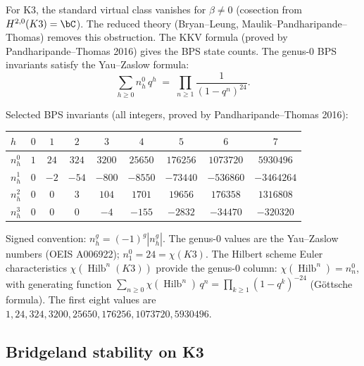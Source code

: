 \begin{remark}
\label{rem:gw-k3}
For K3, the standard virtual class vanishes for $\beta \neq 0$
(cosection from $H^{2,0}(K3) = \bC$). The reduced theory
(Bryan--Leung, Maulik--Pandharipande--Thomas) removes this
obstruction. The KKV formula (proved by Pandharipande--Thomas
2016) gives the BPS state counts. The genus-$0$ BPS invariants
satisfy the Yau--Zaslow formula:
\begin{equation}\label{eq:yau-zaslow}
\sum_{h \geq 0} n^0_h\,q^h \;=\; \prod_{n \geq 1}
\frac{1}{(1 - q^n)^{24}}.
\end{equation}
\end{remark}

\begin{proposition}
\label{prop:bps-k3}
Selected BPS invariants \textup{(}all integers, proved by
Pandharipande--Thomas 2016\textup{)}:
\begin{center}
\small
\renewcommand{\arraystretch}{1.2}
\begin{tabular}{lcccccccc}
$h$ & $0$ & $1$ & $2$ & $3$ & $4$ & $5$ & $6$ & $7$ \\
\hline
$n^0_h$ & $1$ & $24$ & $324$ & $3200$ & $25650$ & $176256$
 & $1073720$ & $5930496$ \\
$n^1_h$ & $0$ & $-2$ & $-54$ & $-800$ & $-8550$ & $-73440$
 & $-536860$ & $-3464264$ \\
$n^2_h$ & $0$ & $0$ & $3$ & $104$ & $1701$ & $19656$
 & $176358$ & $1316808$ \\
$n^3_h$ & $0$ & $0$ & $0$ & $-4$ & $-155$ & $-2832$
 & $-34470$ & $-320320$
\end{tabular}
\end{center}
Signed convention: $n^g_h = (-1)^g |n^g_h|$. The genus-$0$
values are the Yau--Zaslow numbers \textup{(}OEIS A006922\textup{)};
$n^0_1 = 24 = \chi(K3)$.
The Hilbert scheme Euler characteristics
$\chi(\operatorname{Hilb}^n(K3))$ provide the
genus-$0$ column: $\chi(\operatorname{Hilb}^n) = n^0_n$,
with generating function
$\sum_{n \geq 0} \chi(\operatorname{Hilb}^n)\,q^n =
\prod_{k \geq 1}(1-q^k)^{-24}$
\textup{(}G\"ottsche formula\textup{)}. The first eight values
are $1, 24, 324, 3200, 25650, 176256, 1073720, 5930496$.
\end{proposition}

\subsection{Bridgeland stability on K3}
\label{subsec:bridgeland-k3}

